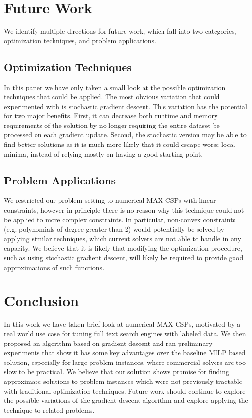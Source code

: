 \documentclass[a4paper]{article}
\begin{document}
\section{Future Work}

We identify multiple directions for future work, which fall into 
two categories, optimization techniques, and problem applications. 

\subsection{Optimization Techniques}

In this paper we have only taken a small look at the possible optimization
techniques that could be applied. The most obvious variation that could experimented with
is stochastic gradient descent. This variation has the potential for two major
benefits. First, it can decrease both runtime and memory requirements
of the solution by no longer requiring the entire dataset be processed
on each gradient update. Second, the stochastic version may be able to find
better solutions as it is much more likely that it could escape worse local
minima, instead of relying mostly on having a good starting point.


\subsection{Problem Applications}

We restricted our problem setting to numerical MAX-CSPs with linear
constraints, however in principle there is no reason why this technique could
not be applied to more complex constraints. In particular, non-convex constraints
(e.g. polynomials of degree greater than 2)
would potentially be solved by applying similar techniques, which current
solvers are not able to handle in any capacity. We believe that it is likely
that modifying the optimization procedure, such as using stochastic gradient
descent, will likely be required to provide good approximations of such
functions.

\section{Conclusion}

In this work we have taken brief look at numerical MAX-CSPs, motivated by a
real world use case for tuning full text search engines with labeled data. We
then proposed an algorithm based on gradient descent and ran preliminary
experiments that show it has some key advantages over the baseline MILP based
solution, especially for large problem instances, where commercial solvers are
too slow to be practical. We believe that our solution shows promise for
finding approximate solutions to problem instances which were not previously
tractable with traditional optimization techniques. Future work should continue
to explore the possible variations of the gradient descent algorithm and
explore applying the technique to related problems. 



\end{document}

